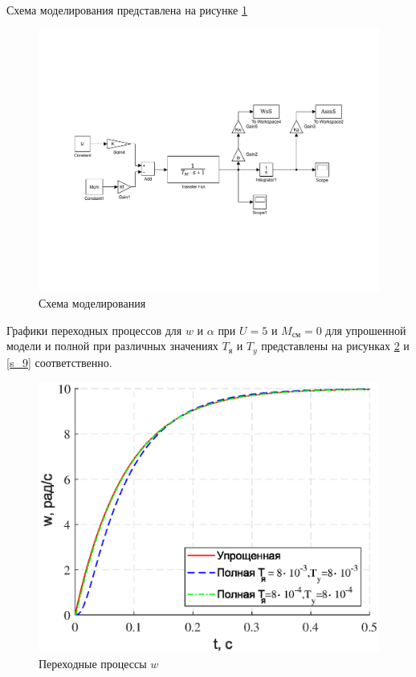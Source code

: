 \documentclass[a4paper,12pt]{article}
\begin{document}
	\paragraph {} Схема моделирования представлена на рисунке \ref{s_7}
	
	\begin{figure}[h]
		\renewcommand{\figurename}{Рисунок}
		\centering
		\includegraphics[width=6in]{Lab10Simple2.pdf}
		\caption{Схема моделирования}
		\label{s_7}
	\end{figure}
	\newpage
	Графики переходных процессов для $w$ и $\alpha$ при $U=5$ и $M_{\text{см}}=0$ для упрошенной модели и полной при различных значениях $T_{\text{я}}$ и $T_y$ представлены на рисунках \ref{s_8} и \ref{s_9} соответственно.
	\begin{figure}[h!]
		
		
				\centering
				\includegraphics[width=5in]{comparew.eps}
				\caption{Переходные процессы $w$} 
				\label{s_8} 
					\end{figure}
\end{document}
